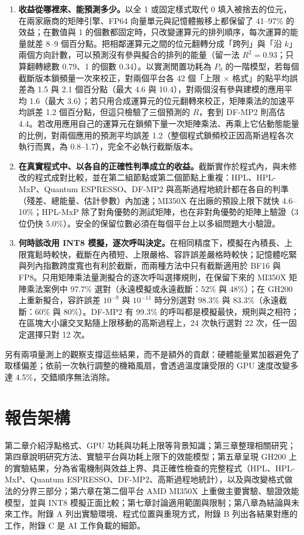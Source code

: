 \begin{enumerate}
  \item \textbf{收益從哪裡來、能預測多少。}以全 1 或固定樣式取代 0 填入被捨去的位元，在兩家廠商的矩陣引擎、FP64 向量單元與記憶體搬移上都保留了 41–97\% 的效益；在數值與 1 的個數都固定時，只改變運算元的排列順序，每次運算的能量就差 8–9 個百分點。把相鄰運算元之間的位元翻轉分成「跨列」與「沿 $k$」兩個方向計數，可以預測沒有參與擬合的排列的能量（留一法 $R^2=0.93$；只算翻轉總數 0.79、1 的個數 0.34）。以實測閒置功耗為 $P_0$ 的一階模型，若每個截斷版本鎖頻量一次來校正，對兩個平台各 42 個「上限 × 格式」的點平均誤差為 1.5 與 2.1 個百分點（最大 4.6 與 10.4），對兩個沒有參與建模的應用平均 1.6（最大 3.6）；若只用合成運算元的位元翻轉來校正，矩陣乘法的加速平均誤差 1.2 個百分點，但這只檢驗了三個預測的 $R$，套到 DF-MP2 則高估 4.4。若改用應用自己的運算元在鎖頻下量一次矩陣乘法、再乘上它佔動態能量的比例，對兩個應用的預測平均誤差 1.2（整個程式鎖頻校正因高斯過程各次執行而異，為 0.8–1.7），完全不必執行截斷版本。
  \item \textbf{在真實程式中、以各自的正確性判準成立的收益。}截斷實作於程式內，與未修改的程式成對比較，並在第二組節點或第二個節點上重複：HPL、HPL-MxP、Quantum ESPRESSO、DF-MP2 與高斯過程地統計都在各自的判準（殘差、總能量、估計參數）內加速；MI350X 在出廠的預設上限下就快 4.6–10\%；HPL-MxP 除了對角優勢的測試矩陣，也在非對角優勢的矩陣上驗證（3 位仍快 5.0\%）。安全的保留位數必須在每個平台上以多組問題大小驗證。
  \item \textbf{何時該改用 INT8 模擬，逐次呼叫決定。}在相同精度下，模擬在內積長、上限寬鬆時較快，截斷在內積短、上限嚴格、容許誤差嚴格時較快；記憶體吃緊與列內指數跨度寬也有利於截斷，而兩種方法中只有截斷適用於 BF16 與 FP8。只用矩陣乘法量測擬合的逐次呼叫選擇規則，在保留下來的 MI350X 矩陣乘法案例中 97.7\% 選對（永遠模擬或永遠截斷：52\% 與 48\%）；在 GH200 上重新擬合，容許誤差 $10^{-9}$ 與 $10^{-11}$ 時分別選對 98.3\% 與 83.3\%（永遠截斷：60\% 與 80\%）。DF-MP2 有 99.3\% 的呼叫都是模擬最快，規則與之相符；在區塊大小讓交叉點隨上限移動的高斯過程上，24 次執行選對 22 次，任一固定選擇只對 12 次。
\end{enumerate}

另有兩項量測上的觀察支撐這些結果，而不是額外的貢獻：硬體能量累加器避免了取樣偏差；依前一次執行調整的機箱風扇，會透過溫度讓受限的 GPU 速度改變多達 4.5\%，交錯順序無法消除。

\section{報告架構}\label{sec:outline}

第二章介紹浮點格式、GPU 功耗與功耗上限等背景知識；第三章整理相關研究；第四章說明研究方法、實驗平台與功耗上限下的效能模型；第五章呈現 GH200 上的實驗結果，分為省電機制與效益上界、具正確性檢查的完整程式（HPL、HPL-MxP、Quantum ESPRESSO、DF-MP2、高斯過程地統計），以及與改變格式做法的分界三部分；第六章在第二個平台 AMD MI350X 上重做主要實驗、驗證效能模型，並與 INT8 模擬正面比較；第七章討論適用範圍與限制；第八章為結論與未來工作。附錄 A 列出實驗環境、程式位置與重現方式，附錄 B 列出各結果對應的工作，附錄 C 是 AI 工作負載的細節。
